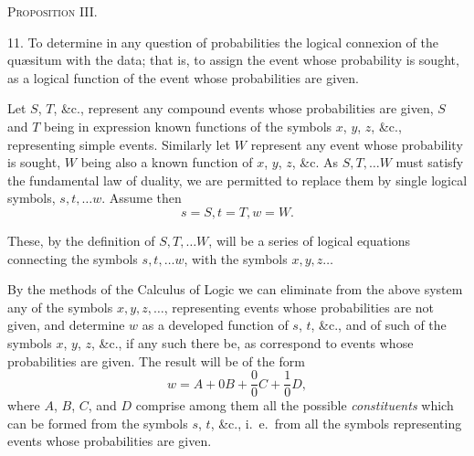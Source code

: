 \documentclass[oneside]{book}
\begin{document}
%
%
\begin{center}\textsc{Proposition III.}\end{center} %

11. %
To determine in any question of probabilities the logical
connexion of the qu\ae{}situm with the data; that is, to assign the event
whose probability is sought, as a logical function of the event whose
probabilities are given.

Let $S$, $T$, \&c., represent any compound events whose probabilities
are given, $S$ and $T$ being in expression known functions
of the symbols $x$, $y$, $z$, \&c., representing simple events.
Similarly let $W$ represent any event whose probability is sought,
$W$ being also a known function of $x$, $y$, $z$, \&c. As $S, T,\dotsc W$
must satisfy the fundamental law of duality, we are permitted
to replace them by single logical symbols, $s, t,\dotsc w$. Assume
then
\[
s = S, t=T, w = W.
\]

These, by the definition of $S, T,\dotsc W$, will be a series of
logical equations connecting the symbols $s, t,\dotsc w$, with the symbols $x, y, z\dotsc$

By the methods of the Calculus of Logic we can eliminate
from the above system any of the symbols $x, y, z,\dotsc$, representing
events whose probabilities are not given, and determine
$w$ as a developed function of $s$, $t$, \&c., and of such of the symbols
$x$, $y$, $z$, \&c., if any such there be, as correspond to events whose
probabilities are given. The result will be of the form
\[
w = A + 0B +\frac{0}{0} C +\frac{1}{0} D,
\]
where $A$, $B$, $C$, and $D$ comprise among them all the possible
\textit{constituents} which can be formed from the symbols $s$, $t$, \&c., i.~e.\
from all the symbols representing events whose probabilities are
given.
\end{document}
